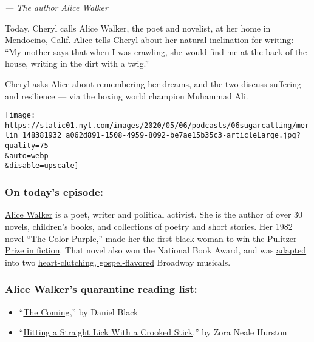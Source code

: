 \emph{--- The author Alice Walker}

Today, Cheryl calls Alice Walker, the poet and novelist, at her home in
Mendocino, Calif. Alice tells Cheryl about her natural inclination for
writing: ``My mother says that when I was crawling, she would find me at
the back of the house, writing in the dirt with a twig.''

Cheryl asks Alice about remembering her dreams, and the two discuss
suffering and resilience --- via the boxing world champion Muhammad Ali.

\texttt{[image: https://static01.nyt.com/images/2020/05/06/podcasts/06sugarcalling/merlin\_148381932\_a062d891-1508-4959-8092-be7ae15b35c3-articleLarge.jpg?quality=75\\\&auto=webp\\\&disable=upscale]}

\hypertarget{on-todays-episode}{%
\subsubsection{\texorpdfstring{\textbf{On today's
episode:}}{On today's episode:}}\label{on-todays-episode}}

\href{https://alicewalkersgarden.com/}{Alice Walker} is a poet, writer
and political activist. She is the author of over 30 novels, children's
books, and collections of poetry and short stories. Her 1982 novel ``The
Color Purple,''
\href{https://www.nytimes.com/2004/10/24/books/review/alice-walker-in-love-and-trouble.html}{made
her the first black woman to win the Pulitzer Prize in fiction}. That
novel also won the National Book Award, and was
\href{https://www.nytimes.com/2005/12/02/theater/reviews/one-womans-awakening-in-double-time.html}{adapted}
into two
\href{https://www.nytimes.com/2015/12/11/theater/review-the-color-purple-on-broadway-stripped-to-its-essence.html}{heart-clutching,
gospel-flavored} Broadway musicals.

\hypertarget{alice-walkers-quarantine-reading-list}{%
\subsubsection{\texorpdfstring{\textbf{Alice Walker's quarantine reading
list:}}{Alice Walker's quarantine reading list:}}\label{alice-walkers-quarantine-reading-list}}

\begin{itemize}
\item
  ``\href{https://us.macmillan.com/books/9781466890671}{The Coming},''
  by Daniel Black
\item
  ``\href{https://www.harpercollins.com/9780062915795/hitting-a-straight-lick-with-a-crooked-stick/}{Hitting
  a Straight Lick With a Crooked Stick},'' by Zora Neale Hurston
\end{itemize}

